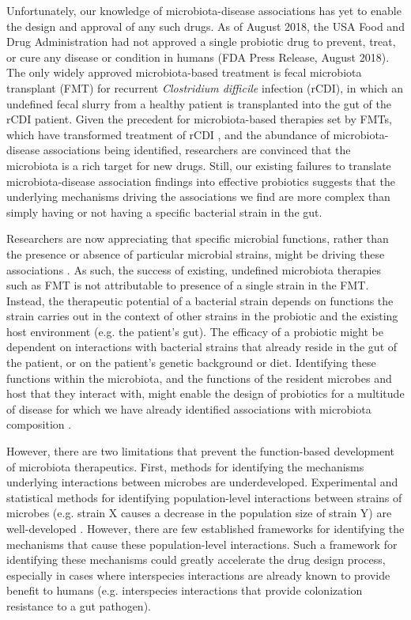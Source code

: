 \documentclass[11pt,twocolumn,notitlepage,openany,twoside]{book}
\begin{document}
\begin{refsection}
Unfortunately, our knowledge of microbiota-disease associations has yet to enable the design and approval of any such drugs. As of August 2018, the USA Food and Drug Administration had not approved a single probiotic drug to prevent, treat, or cure any disease or condition in humans (FDA Press Release, August 2018). The only widely approved microbiota-based treatment is fecal microbiota transplant (FMT) for recurrent \textit{Clostridium difficile} infection (rCDI), in which an undefined fecal slurry from a healthy patient is transplanted into the gut of the rCDI patient. Given the precedent for microbiota-based therapies set by FMTs, which have transformed treatment of rCDI \cite{Kelly2016-ph}, and the abundance of microbiota-disease associations being identified, researchers are convinced that the microbiota is a rich target for new drugs. Still, our existing failures to translate microbiota-disease association findings into effective probiotics suggests that the underlying mechanisms driving the associations we find are more complex than simply having or not having a specific bacterial strain in the gut.

Researchers are now appreciating that specific microbial functions, rather than the presence or absence of particular microbial strains, might be driving these associations \cite{Heintz-Buschart2018-xc}. As such, the success of existing, undefined microbiota therapies such as FMT is not attributable to presence of a single strain in the FMT. Instead, the therapeutic potential of a bacterial strain depends on functions the strain carries out in the context of other strains in the probiotic and the existing host environment (e.g. the patient’s gut). The efficacy of a probiotic might be dependent on interactions with bacterial strains that already reside in the gut of the patient, or on the patient’s genetic background or diet. Identifying these functions within the microbiota, and the functions of the resident microbes and host that they interact with, might enable the design of probiotics for a multitude of disease for which we have already identified associations with microbiota composition \cite{OToole2017-th}.

However, there are two limitations that prevent the function-based development of microbiota therapeutics. First, methods for identifying the mechanisms underlying interactions between microbes are underdeveloped. Experimental and statistical methods for identifying population-level interactions between strains of microbes (e.g. strain X causes a decrease in the population size of strain Y) are well-developed \cite{Gilbert2016-oe}. However, there are few established frameworks for identifying the mechanisms that cause these population-level interactions. Such a framework for identifying these mechanisms could greatly accelerate the drug design process, especially in cases where interspecies interactions are already known to provide benefit to humans (e.g. interspecies interactions that provide colonization resistance to a gut pathogen).


\end{refsection}
\end{document}
